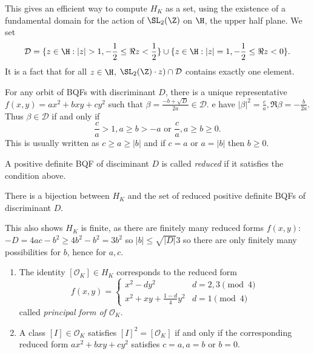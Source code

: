 \documentclass[a4paper]{article}
\renewcommand*{\O}{\mathcal{O}}
\begin{document}
This gives an efficient way to compute \(H_K\) as a set, using the existence of a fundamental domain for the action of \(\SL_2(\Z)\) on \(\H\), the upper half plane. We set
\[
  \mathcal D = \{z \in \H: |z| > 1, -\frac{1}{2} \leq \Re z < \frac{1}{2}\} \cup \{z \in \H: |z| = 1, -\frac{1}{2} \leq \Re z < 0\}.
\]
It is a fact that for all \(z \in \H\), \(\SL_2(\Z) \cdot z) \cap \mathcal D\) contains exactly one element.

For any orbit of BQFs with discriminant \(D\), there is a unique representative \(f(x, y) = ax^2 + bxy + cy^2\) such that \(\beta = \frac{-b + \sqrt D}{2a} \in \mathcal D\). e have \(|\beta|^2 = \frac{c}{a}, \Re \beta = -\frac{b}{2a}\). Thus \(\beta \in \mathcal D\) if and only if
\[
  \frac{c}{a} > 1, a \geq b > -a \text{ or } \frac{c}{a}, a \geq b \geq 0.
\]
This is usually written as \(c \geq a \geq |b|\) and if \(c = a\) or \(a = |b|\) then \(b \geq 0\).

\begin{definition}
  A positive definite BQF of disciminant \(D\) is called \emph{reduced} if it satisfies the condition above.
\end{definition}

\begin{lemma}
  There is a bijection between \(H_K\) and the set of reduced positive definite BQFs of discriminant \(D\).
\end{lemma}

This also shows \(H_K\) is finite, as there are finitely many reduced forms \(f(x, y)\): \(-D = 4ac - b^2 \geq 4b^2 - b^2 = 3b^2\) so \(|b| \leq \sqrt{|D|}{3}\) so there are only finitely many possibilities for \(b\), hence for \(a, c\).

\begin{proposition}\leavevmode
  \begin{enumerate}
  \item The identity \([\O_K] \in H_K\) corresponds to the reduced form
    \[
      f(x, y) =
      \begin{cases}
        x^2 - dy^2 & d = 2, 3 \pmod 4 \\
        x^2 + xy + \frac{1 - d}{4} y^2 & d = 1 \pmod 4
      \end{cases}
    \]
    called \emph{principal form of \(\O_K\)}.
  \item A class \([I] \in \O_K\) satisfies \([I]^2 = [\O_K]\) if and only if the corresponding reduced form \(ax^2 + bxy + cy^2\) satisfies \(c = a, a = b\) or \(b = 0\).
  \end{enumerate}
\end{proposition}
\end{document}
